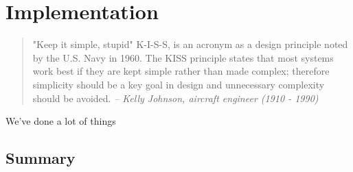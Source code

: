 \chapter{Implementation}\label{ch:implemenation}

\begin{quotation}
"Keep it simple, stupid" K-I-S-S, is an acronym as a design principle noted by the U.S. Navy in 1960. The KISS principle states that most systems work best if they are kept simple rather than made complex; therefore simplicity should be a key goal in design and unnecessary complexity should be avoided.
{\small\it -- Kelly Johnson, aircraft engineer (1910 - 1990)}
\end{quotation}

We've done a lot of things


\section*{Summary}\label{summary-implementation}

